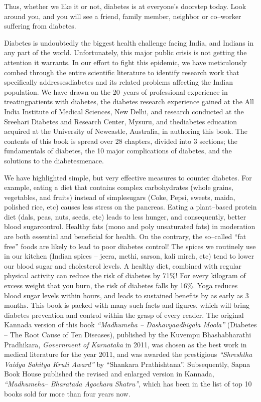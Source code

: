 Thus, whether we like it or not, diabetes is at everyone’s doorstep today. Look around you, and you will see a friend, family member, neighbor or co–worker suffering from diabetes.

Diabetes is undoubtedly the biggest health challenge facing India, and Indians in any part of the world. Unfortunately, this major public crisis is not getting the attention it warrants. In our effort to fight this epidemic, we have meticulously combed through the entire scienti\-fic literature to identify research work that specifically addresses\break diabetes and its related problems affecting the Indian population. We have drawn on the 20–years of professional experience in treating\break patients with diabetes, the diabetes research experience gained at the All India Institute of Medical Sciences, New Delhi, and research condu\-cted at the Sreehari Diabetes and Research Center, Mysuru, and the\break diabetes education acquired at the University of Newcastle, Australia, in authoring this book. The contents of this book is spread over 28 chapters, divided into 3 sections; the fundamentals of diabetes, the 10 major complications of diabetes, and the solutions to the diabetes\break menace.

We have highlighted simple, but very effective measures to cou\-nter diabetes. For example, eating a diet that contains complex carbohydrates (whole grains, vegetables, and fruits) instead of simple\break sugars (Coke, Pepsi, sweets, maida, polished rice, etc) causes less stress on the pancreas. Eating a plant–based protein diet (dals, peas, nuts, seeds, etc) leads to less hunger, and consequently, better blood sugar\break control. Healthy fats (mono and poly unsaturated fats) in moderation are both essential and beneficial for health. On the contrary, the so–called “fat free” foods are likely to lead to poor diabetes control! The spices we routinely use in our kitchen (Indian spices – jeera, methi, sarson, kali mirch, etc) tend to lower our blood sugar and choleste\-rol levels. A healthy diet, combined with regular physical activity can reduce the risk of diabetes by 71\%! For every kilogram of excess weight that you burn, the risk of diabetes falls by 16\%. Yoga reduces blood sugar levels within hours, and leads to sustained benefits by as early as 3 months. This book is packed with many such facts and figures, which will bring diabetes prevention and control within the grasp of every reader. The original Kannada version of this book \textit{“Madhumeha – Dashavyaadhigala Moola”} (Diabetes – The Root Cause of Ten Diseases), published by the Kuvempu Bhashabharathi Pradhikara, \textit{Government of Karnataka} in 2011, was chosen as the best work in medical literature for the year 2011, and was awarded the prestigious \textit{“Shreshtha Vaidya Sahitya Kruti Award”} by “Shankara Prathishtana”. Subsequently, Sapna Book House published the revised and enlarged version in Kannada, \textit{“Madhumeha– Bharatada Agochara Shatru”}, which has been in the list of top 10 books sold for more than four years now.

